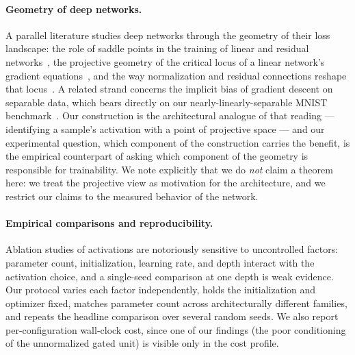 \paragraph{Geometry of deep networks.}
A parallel literature studies deep networks through the geometry of their
loss landscape: the role of saddle points in the training of linear and
residual networks~\citep{saxe2014exact,dauphin2014identifying,goodfellow2014qualitatively},
the projective geometry of the critical locus of a linear
network's gradient equations~\citep{xiuyi2021landscape}, and the way
normalization and residual
connections reshape that locus~\citep{he2016deep,balduzzi2017shattered}. A
related strand concerns the implicit bias of gradient descent on separable
data, which bears directly on our nearly-linearly-separable MNIST
benchmark~\citep{soudry2018implicit}. Our
construction is the architectural analogue
of that reading --- identifying a sample's activation with a point of
projective space --- and our experimental question, which component of the
construction carries the benefit, is the empirical counterpart of asking which
component of the geometry is responsible for trainability. We note explicitly
that we do \emph{not} claim a theorem here: we treat the projective view as
motivation for the architecture, and we restrict our claims to the measured
behavior of the network.

\paragraph{Empirical comparisons and reproducibility.}
Ablation studies of activations are notoriously sensitive to uncontrolled
factors: parameter count, initialization, learning rate, and depth interact
with the activation choice, and a single-seed comparison at one depth is weak
evidence. Our protocol varies each factor independently, holds the
initialization and optimizer fixed, matches parameter count across
architecturally different families, and repeats the headline comparison over
several random seeds. We also report per-configuration wall-clock cost, since
one of our findings (the poor conditioning of the unnormalized gated unit)
is visible only in the cost profile.

